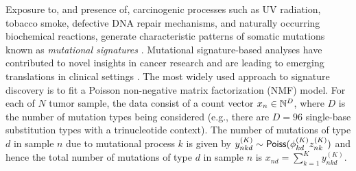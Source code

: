 Exposure to, and presence of, carcinogenic processes such as UV radiation, tobacco smoke, defective DNA repair mechanisms, and naturally occurring biochemical reactions, generate characteristic patterns of somatic mutations known as \emph{mutational signatures} \citep{Alexandrov_mut-sig-NMF_2013,Nik-zainal_MutationalProcessesMolding_2012}.
Mutational signature-based analyses have contributed to novel insights in cancer research \citep[e.g.,][]{Alexandrov_mut-sig-NMF_2013,Nik-zainal_MutationalProcessesMolding_2012,pcawgSV:2020,pcawg2020} and are leading to emerging translations in clinical settings \citep[e.g.,][]{Chakravarty:2021}.
The most widely used approach to signature discovery is to fit a Poisson non-negative matrix factorization (NMF) model. %
For each of $N$ tumor sample, the data consist of a count vector ${x}_{n}\in\mathbb{N}^{D}$,
where $D$ is the number of mutation types being considered (e.g., there are $D=96$ single-base substitution types with a trinucleotide context).
The number of mutations of type $d$ in sample $n$ due to mutational process $k$ is given by
$y^{(K)}_{nkd} \sim {\sf{Poiss}}({\phi}^{(K)}_{kd}z^{(K)}_{nk})$ and hence the total number of mutations of type $d$ in sample $n$ is $x_{nd} = \sum_{k=1}^K y^{(K)}_{nkd}$.


